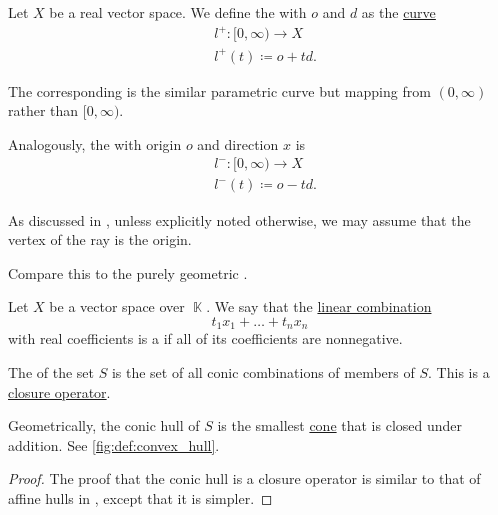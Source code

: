 \begin{definition}\label{def:geometric_ray}\mimprovised
  Let \( X \) be a real vector space. We define the  with  \( o \) and  \( d \) as the \hyperref[def:parametric_curve]{curve}
  \begin{equation*}
    \begin{aligned}
       &l^+: [0, \infty) \to X \\
       &l^+(t) \coloneqq o + td.
    \end{aligned}
  \end{equation*}

  The corresponding  is the similar parametric curve but mapping from \( (0, \infty) \) rather than \( [0, \infty) \).

  Analogously, the  with origin \( o \) and direction \( x \) is
  \begin{equation*}
    \begin{aligned}
       &l^-: [0, \infty) \to X \\
       &l^-(t) \coloneqq o - td.
    \end{aligned}
  \end{equation*}

  As discussed in , unless explicitly noted otherwise, we may assume that the vertex of the ray is the origin.

  Compare this to the purely geometric .
\end{definition}

\begin{definition}\label{def:conic_hull}\mimprovised
  Let \( X \) be a vector space over \( \BbbK \). We say that the \hyperref[rem:linear_combinations]{linear combination}
  \begin{equation*}
    t_1 x_1 + \ldots + t_n x_n
  \end{equation*}
  with real coefficients is a  if all of its coefficients are nonnegative.

  The  of the set \( S \) is the set of all conic combinations of members of \( S \). This is a \hyperref[def:closure_operator]{closure operator}.

  Geometrically, the conic hull of \( S \) is the smallest \hyperref[def:geometric_cone]{cone} that is closed under addition. See \cref{fig:def:convex_hull}.
\end{definition}
\begin{proof}
  The proof that the conic hull is a closure operator is similar to that of affine hulls in , except that it is simpler.
\end{proof}

